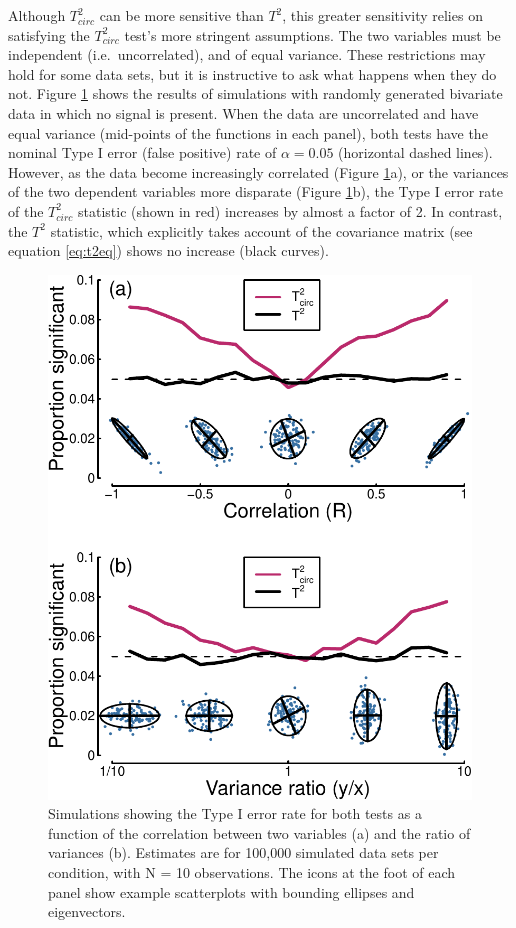\documentclass[]{article}
\begin{document}
Although \(T^2_{circ}\) can be more sensitive than \(T^2\), this greater sensitivity relies on satisfying the \(T^2_{circ}\) test's more stringent assumptions. The two variables must be independent (i.e.~uncorrelated), and of equal variance. These restrictions may hold for some data sets, but it is instructive to ask what happens when they do not. Figure \ref{fig:falsealarms} shows the results of simulations with randomly generated bivariate data in which no signal is present. When the data are uncorrelated and have equal variance (mid-points of the functions in each panel), both tests have the nominal Type I error (false positive) rate of \(\alpha = 0.05\) (horizontal dashed lines). However, as the data become increasingly correlated (Figure \ref{fig:falsealarms}a), or the variances of the two dependent variables more disparate (Figure \ref{fig:falsealarms}b), the Type I error rate of the \(T^2_{circ}\) statistic (shown in red) increases by almost a factor of 2. In contrast, the \(T^2\) statistic, which explicitly takes account of the covariance matrix (see equation \eqref{eq:t2eq}) shows no increase (black curves).

\begin{figure}
\centering
\includegraphics{manuscript_files/figure-latex/falsealarms-1.pdf}
\caption{\label{fig:falsealarms}Simulations showing the Type I error rate for both tests as a function of the correlation between two variables (a) and the ratio of variances (b). Estimates are for 100,000 simulated data sets per condition, with N = 10 observations. The icons at the foot of each panel show example scatterplots with bounding ellipses and eigenvectors.}
\end{figure}
\end{document}
